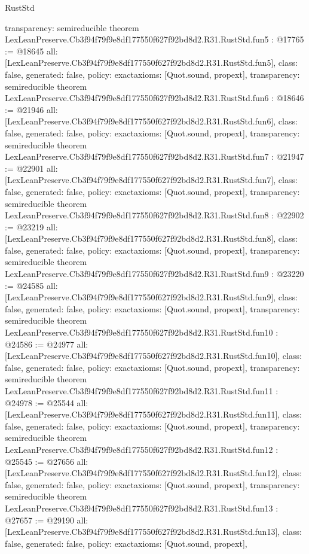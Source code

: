 \begin{lexlean}{RustStd}
\begin{coremodule}
{  transparency: semireducible
}
theorem LexLeanPreserve.Cb3f94f79f9e8df177550f627f92bd8d2.R31.RustStd.fun5 : @17765 := @18645 {
  all: [LexLeanPreserve.Cb3f94f79f9e8df177550f627f92bd8d2.R31.RustStd.fun5],
  class: false,
  generated: false,
  policy: exact{axioms: [Quot.sound, propext]},
  transparency: semireducible
}
theorem LexLeanPreserve.Cb3f94f79f9e8df177550f627f92bd8d2.R31.RustStd.fun6 : @18646 := @21946 {
  all: [LexLeanPreserve.Cb3f94f79f9e8df177550f627f92bd8d2.R31.RustStd.fun6],
  class: false,
  generated: false,
  policy: exact{axioms: [Quot.sound, propext]},
  transparency: semireducible
}
theorem LexLeanPreserve.Cb3f94f79f9e8df177550f627f92bd8d2.R31.RustStd.fun7 : @21947 := @22901 {
  all: [LexLeanPreserve.Cb3f94f79f9e8df177550f627f92bd8d2.R31.RustStd.fun7],
  class: false,
  generated: false,
  policy: exact{axioms: [Quot.sound, propext]},
  transparency: semireducible
}
theorem LexLeanPreserve.Cb3f94f79f9e8df177550f627f92bd8d2.R31.RustStd.fun8 : @22902 := @23219 {
  all: [LexLeanPreserve.Cb3f94f79f9e8df177550f627f92bd8d2.R31.RustStd.fun8],
  class: false,
  generated: false,
  policy: exact{axioms: [Quot.sound, propext]},
  transparency: semireducible
}
theorem LexLeanPreserve.Cb3f94f79f9e8df177550f627f92bd8d2.R31.RustStd.fun9 : @23220 := @24585 {
  all: [LexLeanPreserve.Cb3f94f79f9e8df177550f627f92bd8d2.R31.RustStd.fun9],
  class: false,
  generated: false,
  policy: exact{axioms: [Quot.sound, propext]},
  transparency: semireducible
}
theorem LexLeanPreserve.Cb3f94f79f9e8df177550f627f92bd8d2.R31.RustStd.fun10 : @24586 := @24977 {
  all: [LexLeanPreserve.Cb3f94f79f9e8df177550f627f92bd8d2.R31.RustStd.fun10],
  class: false,
  generated: false,
  policy: exact{axioms: [Quot.sound, propext]},
  transparency: semireducible
}
theorem LexLeanPreserve.Cb3f94f79f9e8df177550f627f92bd8d2.R31.RustStd.fun11 : @24978 := @25544 {
  all: [LexLeanPreserve.Cb3f94f79f9e8df177550f627f92bd8d2.R31.RustStd.fun11],
  class: false,
  generated: false,
  policy: exact{axioms: [Quot.sound, propext]},
  transparency: semireducible
}
theorem LexLeanPreserve.Cb3f94f79f9e8df177550f627f92bd8d2.R31.RustStd.fun12 : @25545 := @27656 {
  all: [LexLeanPreserve.Cb3f94f79f9e8df177550f627f92bd8d2.R31.RustStd.fun12],
  class: false,
  generated: false,
  policy: exact{axioms: [Quot.sound, propext]},
  transparency: semireducible
}
theorem LexLeanPreserve.Cb3f94f79f9e8df177550f627f92bd8d2.R31.RustStd.fun13 : @27657 := @29190 {
  all: [LexLeanPreserve.Cb3f94f79f9e8df177550f627f92bd8d2.R31.RustStd.fun13],
  class: false,
  generated: false,
  policy: exact{axioms: [Quot.sound, propext]},
}
\end{coremodule}
\end{lexlean}
